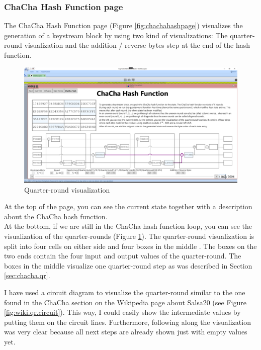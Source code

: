 \subsubsection{ChaCha Hash Function page}

The ChaCha Hash Function page (Figure \ref{fig:chachahashpage}) visualizes the generation of a keystream block by using two kind of visualizations: The quarter-round visualization and the addition / reverse bytes step at the end of the hash function.

\begin{figure}
  \centering
  \includegraphics[width=\textwidth]{figures/ct2/chachahash/chachahash-mid-qr.png}
  \caption{Quarter-round visualization}
  \label{fig:chachahash.mid.qr}
\end{figure}

At the top of the page, you can see the current state together with a description about the ChaCha hash function.\\
At the bottom, if we are still in the ChaCha hash function loop, you can see the visualization of the quarter-rounds (Figure \ref{fig:chachahash.mid.qr}). The quarter-round visualization is split into four cells on either side and four boxes in the middle . The boxes on the two ends contain the four input and output values of the quarter-round. The boxes in the middle visualize one quarter-round step as was described in Section \ref{sec:chacha.qr}.

I have used a circuit diagram to visualize the quarter-round similar to the one found in the ChaCha section on the Wikipedia page about Salsa20 (see Figure \ref{fig:wiki.qr.circuit}). This way, I could easily show the intermediate values by putting them on the circuit lines. Furthermore, following along the visualization was very clear because all next steps are already shown just with empty values yet.


